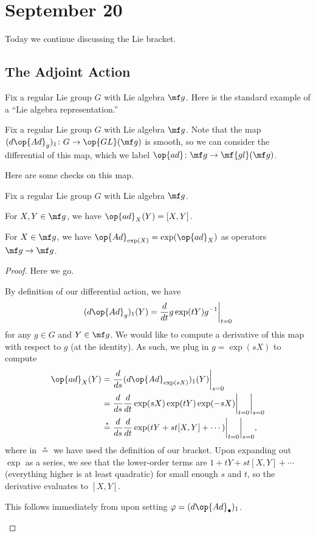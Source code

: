 \documentclass[../notes.tex]{subfiles}
\begin{document}
\section{September 20}
Today we continue discussing the Lie bracket.

\subsection{The Adjoint Action}
Fix a regular Lie group $G$ with Lie algebra $\mf g$. Here is the standard example of a ``Lie algebra representation.''
\begin{notation}
	Fix a regular Lie group $G$ with Lie algebra $\mf g$. Note that the map $(d{\op{Ad}_g})_1\colon G\to\op{GL}(\mf g)$ is smooth, so we can consider the differential of this map, which we label $\op{ad}\colon\mf g\to\mf{gl}(\mf g)$.
\end{notation}
Here are some checks on this map.
\begin{proposition} \label{prop:commutator-by-adjoint}
	Fix a regular Lie group $G$ with Lie algebra $\mf g$.
	\begin{listalph}
		\item For $X,Y\in\mf g$, we have $\op{ad}_X(Y)=[X,Y]$.
		\item For $X\in\mf g$, we have ${\op{Ad}_{\exp(X)}}=\exp({\op{ad}_X})$ as operators $\mf g\to\mf g$.
	\end{listalph}
\end{proposition}
\begin{proof}
	Here we go.
	\begin{listalph}
		\item By definition of our differential action, we have
		\[(d{\op{Ad}_g})_1(Y)=\frac d{dt}g\exp(tY)g^{-1}\bigg|_{t=0}\]
		for any $g\in G$ and $Y\in\mf g$. We would like to compute a derivative of this map with respect to $g$ (at the identity). As such, we plug in $g=\exp(sX)$ to compute
		\begin{align*}
			\op{ad}_X(Y) &= \frac d{ds}(d{\op{Ad}_{\exp(sX)}})_1(Y)\bigg|_{s=0} \\
			&= \frac d{ds}\frac d{dt}\exp(sX)\exp(tY)\exp(-sX)\bigg|_{t=0}\bigg|_{s=0} \\
			&\stackrel*= \frac d{ds}\frac d{dt}\exp(tY+st[X,Y]+\cdots)\bigg|_{t=0}\bigg|_{s=0},
		\end{align*}
		where in $\stackrel*=$ we have used the definition of our bracket. Upon expanding out $\exp$ as a series, we see that the lower-order terms are $1+tY+st[X,Y]+\cdots$ (everything higher is at least quadratic) for small enough $s$ and $t$, so the derivative evaluates to $[X,Y]$.
		\item This follows immediately from  upon setting $\varphi=(d{\op{Ad}_\bullet})_1$.
		\qedhere
	\end{listalph}
\end{proof}
\end{document}
